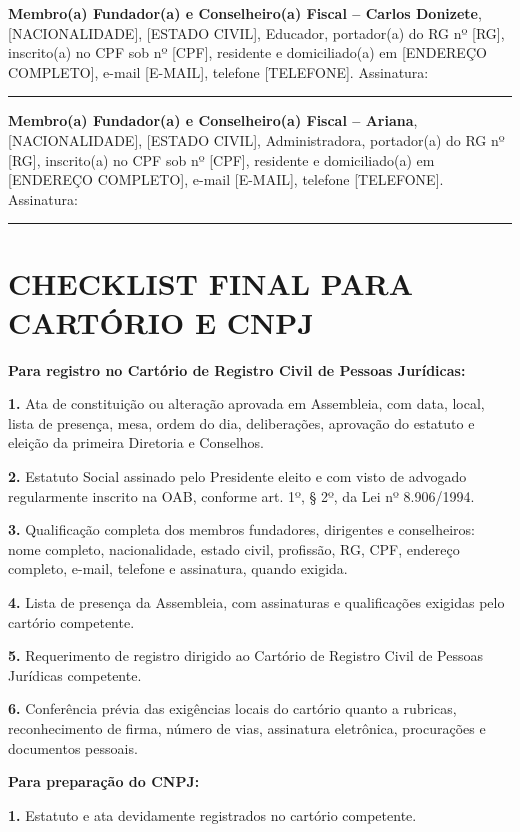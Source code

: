 \documentclass[11pt,a4paper]{article}
\begin{document}
\vspace{1em}

\textbf{Membro(a) Fundador(a) e Conselheiro(a) Fiscal -- Carlos Donizete}, [NACIONALIDADE], [ESTADO CIVIL], Educador, portador(a) do RG nº [RG], inscrito(a) no CPF sob nº [CPF], residente e domiciliado(a) em [ENDEREÇO COMPLETO], e-mail [E-MAIL], telefone [TELEFONE]. Assinatura: \rule{6cm}{0.4pt}

\vspace{1em}

\textbf{Membro(a) Fundador(a) e Conselheiro(a) Fiscal -- Ariana}, [NACIONALIDADE], [ESTADO CIVIL], Administradora, portador(a) do RG nº [RG], inscrito(a) no CPF sob nº [CPF], residente e domiciliado(a) em [ENDEREÇO COMPLETO], e-mail [E-MAIL], telefone [TELEFONE]. Assinatura: \rule{6cm}{0.4pt}

\newpage

\section*{CHECKLIST FINAL PARA CARTÓRIO E CNPJ}

\textbf{Para registro no Cartório de Registro Civil de Pessoas Jurídicas:}

\textbf{1.} Ata de constituição ou alteração aprovada em Assembleia, com data, local, lista de presença, mesa, ordem do dia, deliberações, aprovação do estatuto e eleição da primeira Diretoria e Conselhos.

\textbf{2.} Estatuto Social assinado pelo Presidente eleito e com visto de advogado regularmente inscrito na OAB, conforme art. 1º, § 2º, da Lei nº 8.906/1994.

\textbf{3.} Qualificação completa dos membros fundadores, dirigentes e conselheiros: nome completo, nacionalidade, estado civil, profissão, RG, CPF, endereço completo, e-mail, telefone e assinatura, quando exigida.

\textbf{4.} Lista de presença da Assembleia, com assinaturas e qualificações exigidas pelo cartório competente.

\textbf{5.} Requerimento de registro dirigido ao Cartório de Registro Civil de Pessoas Jurídicas competente.

\textbf{6.} Conferência prévia das exigências locais do cartório quanto a rubricas, reconhecimento de firma, número de vias, assinatura eletrônica, procurações e documentos pessoais.

\textbf{Para preparação do CNPJ:}

\textbf{1.} Estatuto e ata devidamente registrados no cartório competente.
\end{document}
